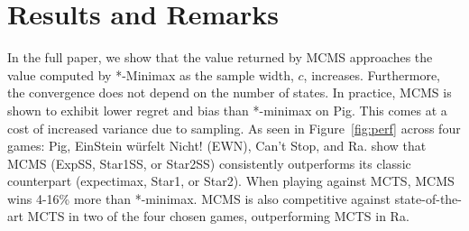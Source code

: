 \documentclass{article}
\begin{document}
\section{Results and Remarks}

In the full paper, we show that the value returned by MCMS approaches the value computed 
by *-Minimax as the sample width, $c$, increases. 
Furthermore, the convergence does not depend on the number of states. 
In practice, MCMS is shown to exhibit lower regret and bias than *-minimax on Pig. 
This comes at a cost of increased variance due to sampling. 
As seen in Figure~\ref{fig:perf} across four games: Pig, EinStein w\"{u}rfelt Nicht! (EWN), Can't Stop, and Ra.
show that MCMS (ExpSS, Star1SS, or Star2SS) 
consistently outperforms its classic counterpart (expectimax, Star1, or Star2). 
When playing against MCTS, MCMS wins 4-16\% more than *-minimax. 
MCMS is also competitive against state-of-the-art MCTS in two of the four chosen games, outperforming 
MCTS in Ra. 



\end{document}
